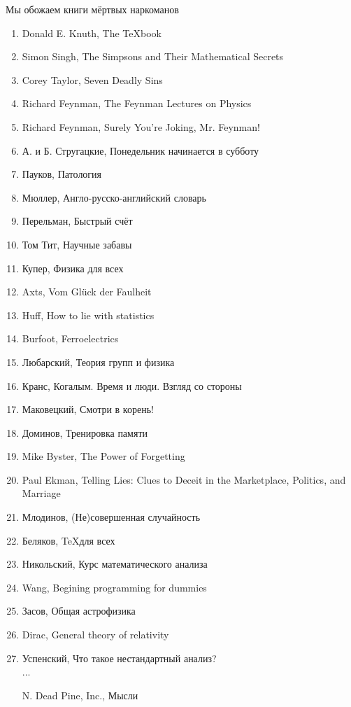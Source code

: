 \subtitle{Наш список книг для необязательного прочтения} %
\begin{epigraph}
    Мы обожаем книги мёртвых наркоманов
\end{epigraph}

\vspace{-1em}\begin{enumerate}
    \item Donald E. Knuth, The {\TeX}book
    \item Simon Singh, The Simpsons and Their Mathematical Secrets
    \item Corey Taylor, Seven Deadly Sins
    \item Richard Feynman, The Feynman Lectures on Physics
    \item Richard Feynman, Surely You're Joking, Mr. Feynman!
    \item А. и Б. Стругацкие, Понедельник начинается в субботу
    \item Пауков, Патология
    \item Мюллер, Англо-русско-английский словарь
    \item Перельман, Быстрый счёт
    \item Том Тит, Научные забавы
    \item Купер, Физика для всех
    \item Axts,  Vom Gl\"uck der Faulheit
    \item Huff, How to lie with statistics
    \item Burfoot, Ferroelectrics
    \item Любарский, Теория групп и физика
    \item Кранс, Когалым. Время и люди. Взгляд со стороны
    \item Маковецкий, Смотри в корень!
    \item Доминов, Тренировка памяти
    \item Mike Byster, The Power of Forgetting
    \item Paul Ekman, Telling Lies: Clues to Deceit in the Marketplace, Politics, and Marriage
    \item Млодинов, (Не)совершенная случайность
    \item Беляков, \TeX для всех
    \item Никольский, Курс математического анализа
    \item Wang, Begining programming for dummies
    \item Засов, Общая астрофизика
    \item Dirac, General theory of relativity
    \item Успенский, Что такое нестандартный анализ?\\
    ...
    \item[N.] Dead Pine, Inc., Мысли
\end{enumerate}

